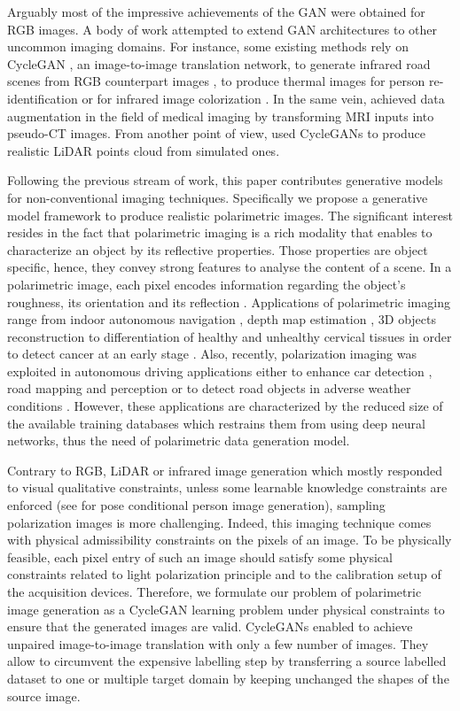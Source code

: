 Arguably most of the impressive achievements of the GAN were obtained for RGB images. A body of work attempted to extend GAN architectures to other uncommon imaging domains. For instance, some existing methods rely on CycleGAN \citep{Zhu2017a}, an image-to-image translation network, to generate infrared road scenes from RGB counterpart images \citep{Zhang2018b}, to produce thermal images for person re-identification \citep{Kniaz2018} or for infrared image colorization \cite{Mehri2019}. In the same vein,  \citet{Nie2017} achieved data augmentation in the field of medical imaging by transforming MRI inputs into pseudo-CT images.  From another point of view, \citet{Sallab2019} used CycleGANs to produce realistic LiDAR points cloud from simulated ones. 


Following the previous stream of work, this paper contributes generative models for non-conventional imaging techniques. Specifically we propose a  generative model framework to produce realistic polarimetric images.  The significant interest resides in the fact that polarimetric imaging is a rich modality that enables to characterize an object by its reflective properties. Those properties are object specific, hence, they convey strong features to analyse the content of a scene. In a polarimetric image, each pixel encodes information regarding the object's roughness, its orientation and its reflection \citep{Wolff1995}. Applications of polarimetric imaging range from indoor autonomous navigation \citep{Berger2017}, depth map estimation \citep{Zhu2019}, 3D objects reconstruction \citep{Morel2006} to differentiation of healthy and unhealthy cervical tissues in order to detect cancer at an early stage \citep{Rehbinder2016}. Also, recently, polarization imaging was exploited in autonomous driving applications either to enhance car detection \citep{Fan2018}, road mapping and perception \citep{Aycock2017} or to detect road objects in adverse weather conditions \citep{Blin2019}.  However, these  applications are characterized by the reduced size of the available training databases which restrains them from using deep neural networks, thus the need of polarimetric data generation model. 

Contrary to RGB, LiDAR or infrared image generation which mostly responded to visual qualitative  constraints, unless some learnable knowledge constraints are enforced (see \cite{Hu2018} for pose conditional person image generation), sampling polarization images is more challenging. Indeed, this imaging technique comes with physical admissibility constraints on the pixels of an image. To be physically feasible, each pixel entry of such an image should satisfy some physical constraints related to light polarization principle and to the calibration setup of the acquisition devices.
Therefore, we formulate our problem of polarimetric image generation as a CycleGAN learning problem under physical constraints to ensure that the generated images are valid. CycleGANs \citep{Zhu2017a} enabled to achieve unpaired image-to-image translation with only a few number of images. 
They allow to circumvent the expensive labelling step by transferring a source labelled dataset to one or multiple target domain \citep{Almahairi2018} by keeping unchanged the shapes of the source image. 


